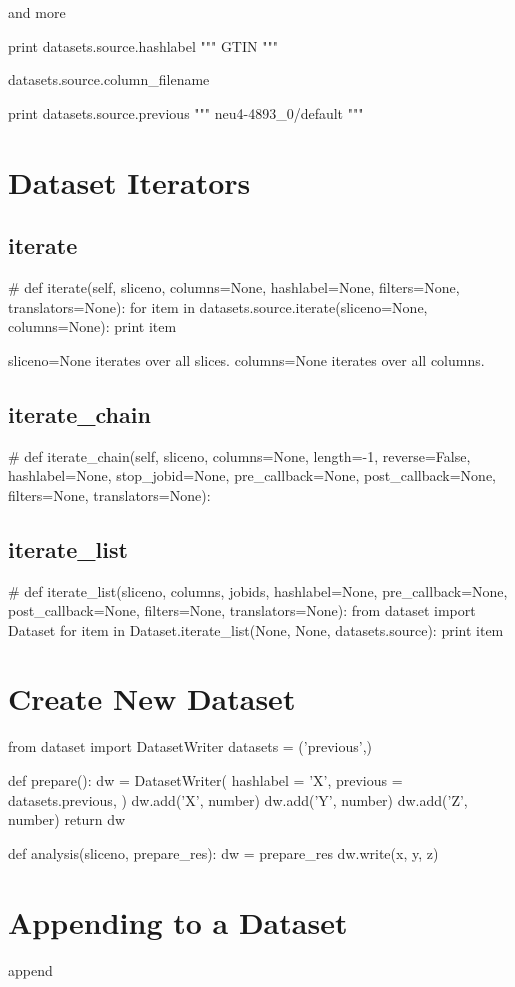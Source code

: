 and more

\begin{python}
  print datasets.source.hashlabel
  """
GTIN
"""
\end{python}
\begin{python}
datasets.source.column\_filename
\end{python}

\begin{python}
  print datasets.source.previous
  """
neu4-4893_0/default
"""
\end{python}




\section{Dataset Iterators}

\subsection{iterate}
\begin{python}
# def iterate(self, sliceno, columns=None, hashlabel=None, filters=None, translators=None):
  for item in datasets.source.iterate(sliceno=None, columns=None):
    print item
\end{python}
sliceno=None iterates over all slices.
columns=None iterates over all columns.

\subsection{iterate\_chain}
\begin{python}
# def iterate_chain(self, sliceno, columns=None, length=-1, reverse=False, hashlabel=None, stop_jobid=None, pre_callback=None, post_callback=None, filters=None, translators=None):
\end{python}



\subsection{iterate\_list}
\begin{python}
  # def iterate_list(sliceno, columns, jobids, hashlabel=None, pre_callback=None, post_callback=None, filters=None, translators=None):
  from dataset import Dataset
  for item in Dataset.iterate_list(None, None, datasets.source):
    print item
\end{python}


\section{Create New Dataset}
\begin{python}
from dataset import DatasetWriter
datasets = ('previous',)

def prepare():
  dw = DatasetWriter(
    hashlabel = 'X',
    previous = datasets.previous,
  )
  dw.add('X', number)
  dw.add('Y', number)
  dw.add('Z', number)
  return dw

def analysis(sliceno, prepare_res):
  dw = prepare_res
  dw.write(x, y, z)
\end{python}

\section{Appending to a Dataset}
append


  
